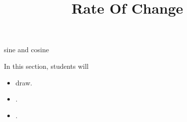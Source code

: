 \documentclass{ximera}
\title{Rate Of Change}
\begin{document}
\begin{abstract}
%
\end{abstract}
\maketitle




sine and cosine

\begin{sectionOutcomes}
In this section, students will 

\begin{itemize}
\item draw.
\item .
\item .
\end{itemize}
\end{sectionOutcomes}
\end{document}
